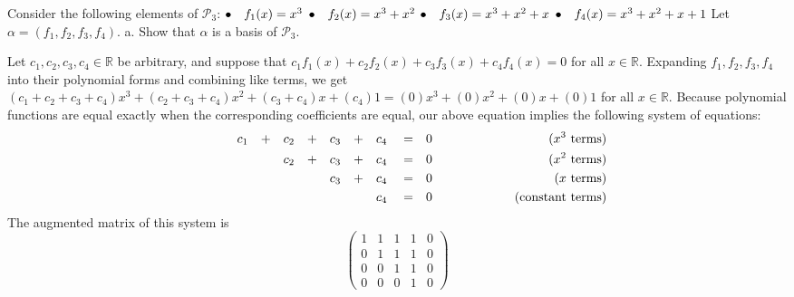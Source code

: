 \documentclass[12pt]{article}
\newenvironment{problem}[2][Problem]
{
	\begin{trivlist} 
		\item[\hskip \labelsep {\bfseries #1 #2:}]
	}
{
	\end{trivlist}
	}
\newenvironment{solution}[1][Solution]
{
	\begin{trivlist} 
		\item[\hskip \labelsep {\itshape #1:}]
	}
	{
	\end{trivlist}
}
\begin{document}
\newpage
\begin{problem}{2}
Consider the following elements of $\mathcal{P}_3$:
\newline
\newline
$\bullet \hphantom{10} f_1 (x) = x^3$
\newline
\newline
$\bullet \hphantom{10} f_2 (x) = x^3 + x^2$
\newline
\newline
$\bullet \hphantom{10} f_3 (x) = x^3 + x^2 +x$
\newline
\newline
$\bullet \hphantom{10} f_4 (x) = x^3 + x^2 +x + 1$
\newline
\newline
\noindent
Let $\alpha =(f_1,f_2,f_3,f_4)$.
\noindent
\newline
\newline
a. Show that $\alpha$ is a basis of $\mathcal{P}_3$.
\begin{solution}
Let $c_1,c_2,c_3,c_4 \in \mathbb{R}$ be arbitrary, and suppose that $c_1 f_1(x) + c_2 f_2(x) + c_3 f_3(x) + c_4 f_4(x) =0$ for all $x \in \mathbb{R}$. Expanding $f_1,f_2,f_3,f_4$ into their polynomial forms and combining like terms, we get $(c_1+c_2+c_3+c_4)x^3 + (c_2+c_3+c_4)x^2 + (c_3+c_4)x + (c_4)1 = (0)x^3 + (0)x^2 +(0)x +(0)1$ for all $x \in \mathbb{R}$. Because polynomial functions are equal exactly when the corresponding coefficients are equal, our above equation implies the following system of equations:
\begin{align*}
&&&&&&&& &&&&&&&& &&&&&&&& &c_1& &+& &c_2& &+& &c_3& &+& &c_4& &=& &0&  &&&&&&&& \hphantom{100} \text{($x^3$ terms)} &&&&&&&& &&&&&&&& \\
&&&&&&&& &&&&&&&& &&&&&&&& &\hphantom{1}& &\hphantom{1}& &c_2& &+& &c_3& &+& &c_4& &=& &0&  &&&&&&&& \hphantom{100} \text{($x^2$ terms)} &&&&&&&& &&&&&&&& \\
&&&&&&&& &&&&&&&& &&&&&&&& &\hphantom{1}& &\hphantom{1}& &\hphantom{1}& &\hphantom{1}& &c_3& &+& &c_4& &=& &0&  &&&&&&&& \hphantom{100} \text{($x$ terms)} &&&&&&&& &&&&&&&& \\
&&&&&&&& &&&&&&&& &&&&&&&& &\hphantom{1}& &\hphantom{1}& &\hphantom{1}& &\hphantom{1}& &\hphantom{1}& &\hphantom{1}& &c_4& &=& &0&  &&&&&&&&  \hphantom{100} \text{(constant terms)} &&&&&&&& &&&&&&&&
\end{align*}
The augmented matrix of this system is
\[
\begin{pmatrix} 1&1&1&1&0\\ 0&1&1&1&0 \\ 0&0&1&1&0 \\ 0&0&0&1&0\end{pmatrix}
\]
\end{solution}
\end{problem}
\end{document}
